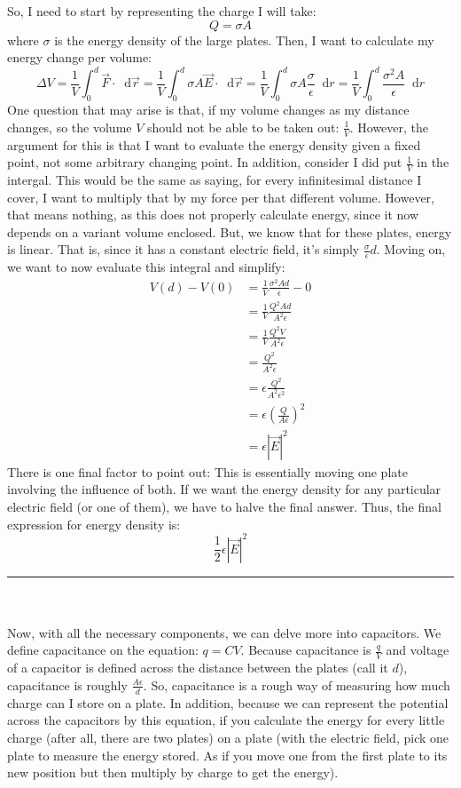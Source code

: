 \documentclass{article}
\newcommand*\dif{\mathop{}\!\mathrm{d}}
\begin{document}
So, I need to start by representing the charge I will take: $$Q = \sigma A$$where $\sigma$ is the energy density of the large plates. Then, I want to calculate my energy change per volume: $$\Delta V = \frac{1}{V}\int_0^d \vec{F} \cdot \dif \vec{r} = \frac{1}{V}\int_0^d \sigma A \vec{E} \cdot\dif \vec{r} = \frac{1}{V}\int_0^d \sigma A \frac{\sigma}{\epsilon}\dif r = \frac{1}{V}\int_0^d \frac{\sigma^2A}{\epsilon}\dif r$$One question that may arise is that, if my volume changes as my distance changes, so the volume $V$ should not be able to be taken out: $\frac{1}{V}$. However, the argument for this is that I want to evaluate the energy density given a fixed point, not some arbitrary changing point. In addition, consider I did put $\frac{1}{V}$ in the intergal. This would be the same as saying, for every infinitesimal distance I cover, I want to multiply that by my force per that different volume. However, that means nothing, as this does not properly calculate energy, since it now depends on a variant volume enclosed. But, we know that for these plates, energy is linear. That is, since it has a constant electric field, it's simply $\frac{\sigma}{\epsilon}d$. Moving on, we want to now evaluate this integral and simplify: 
\begin{align*}
V(d)-V(0) &= \frac{1}{V}\frac{\sigma^2Ad}{\epsilon} - 0\\
&= \frac{1}{V}\frac{Q^2Ad}{A^2\epsilon}\\
&= \frac{1}{V}\frac{Q^2V}{A^2\epsilon}\\
&= \frac{Q^2}{A^2\epsilon}\\
&= \epsilon\frac{Q^2}{A^2\epsilon^2}\\
&= \epsilon(\frac{Q}{A\epsilon})^2\\
&= \epsilon|\vec{E}|^2
\end{align*}
There is one final factor to point out: This is essentially moving one plate involving the influence of both. If we want the energy density for any particular electric field (or one of them), we have to halve the final answer. Thus, the final expression for energy density is:$$\frac{1}{2}\epsilon|\vec{E}|^2$$
\noindent\rule{\textwidth}{1pt}
\\
\\
Now, with all the necessary components, we can delve more into capacitors. We define capacitance on the equation: $q = CV$. Because capacitance is $\frac{q}{V}$ and voltage of a capacitor is defined across the distance between the plates (call it $d$), capacitance is roughly $\frac{A\epsilon}{d}$. So, capacitance is a rough way of measuring how much charge can I store on a plate. In addition, because we can represent the potential across the capacitors by this equation, if you calculate the energy for every little charge (after all, there are two plates) on a plate (with the electric field, pick one plate to measure the energy stored. As if you move one from the first plate to its new position but then multiply by charge to get the energy).
\end{document}
